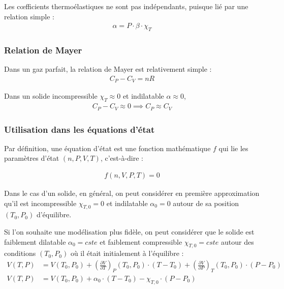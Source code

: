 \documentclass[a4paper]{book}
\begin{document}
Les c{\oe}fficients thermoélastiques ne sont pas indépendants, puisque lié par une relation simple : 
\begin{align*}
\alpha = P \cdot \beta \cdot \chi_T
\end{align*}

\subsubsection{Relation de Mayer}

Dans un gaz parfait, la relation de Mayer est relativement simple :
\begin{align*}
C_P - C_V = nR
\end{align*}

Dans un solide incompressible $\chi_T \approx 0$ et indilatable $\alpha \approx 0$, 
\begin{align*}
C_P - C_V \approx 0 \implies C_P \approx C_V
\end{align*}

\subsubsection{Utilisation dans les équations d'état}

Par définition, une équation d'état est une fonction mathématique $f$ qui lie les paramètres d'état $(n, P, V, T)$, c'est-à-dire : 

\begin{align*}
f(n,V, P, T) = 0
\end{align*}

Dans le cas d'un solide, en général, on peut considérer en première approximation qu'il est incompressible $\chi_{T,0} = 0$ et indilatable $\alpha_0 = 0$ autour de sa position $(T_0, P_0)$ d'équilibre.

Si l'on souhaite une modélisation plus fidèle, on peut considérer que le solide est faiblement dilatable $\alpha_0 = cste$ et faiblement compressible $\chi_{T,0} = cste$ autour des conditions $(T_0, P_0)$ où il était initialement à l'équilibre : 
\begin{align*}
V (T, P) &= V(T_0, P_0) + \left( \frac{\partial V}{\partial T} \right)_P(T_0, P_0) \cdot (T-T_0) + \left( \frac{\partial V}{\partial P} \right)_T (T_0, P_0) \cdot (P-P_0) \\
V (T, P) &= V(T_0, P_0) + \alpha_0 \cdot (T-T_0) - \chi_{T,0} \cdot (P-P_0)
\end{align*}
\end{document}
